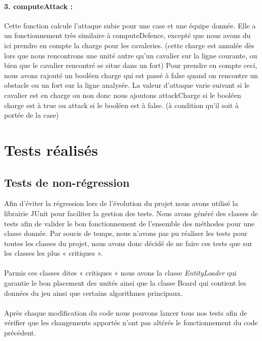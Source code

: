 			\paragraph{3. computeAttack : }
			Cette fonction calcule l'attaque subie pour une case et une équipe donnée.
			Elle a un fonctionnement très similaire à computeDefence, excepté que nous avons du ici prendre en compte la charge pour les cavaleries. 
			(cette charge est annulée dès lors que nous rencontrons une unité autre qu'un cavalier sur la ligne courante, ou bien que le cavalier rencontré se situe dans un fort)
			Pour prendre en compte ceci, nous avons rajouté un booléen charge qui est passé à false quand on rencontre un obstacle 
			ou un fort sur la ligne analysée.
			La valeur d'attaque varie suivant si le cavalier est en charge ou non donc nous ajoutons attackCharge si le booléen charge est 
			à true ou attack si le booléen est à false. (à condition qu'il soit à portée de la case)
			
		\clearpage
	 

	\section{Tests réalisés}

		\subsection{Tests de non-régression}
		
		Afin d'éviter la régression lors de l'évolution du projet nous avons utilisé la librairie JUnit pour faciliter la gestion des tests. 
		Nous avons généré des classes de tests afin de valider le bon fonctionnement de l'ensemble des méthodes pour une classe donnée.
		Par soucis de temps, nous n'avons pas pu réaliser les tests pour toutes les classes du projet, nous avons donc décidé de ne faire ces tests que sur les classes les plus « critiques ».\\ \\
		Parmis ces classes dites « critiques » nous avons la classe {\itshape EntityLoader} qui garantie le bon placement des unités ainsi que la classe Board qui contient les données du jeu
		ainsi que certains algorithmes principaux.
		\\ \\
		Après chaque modification du code nous pouvons lancer tous nos tests afin de vérifier que les changements apportés n'ont pas altérés le fonctionnement du code précédent.
		
